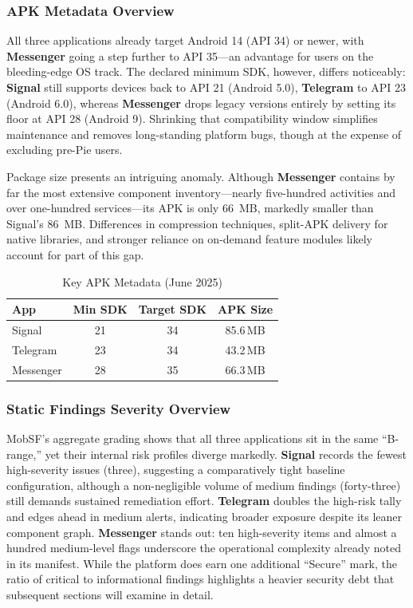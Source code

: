 \documentclass[a4paper,12pt]{report}
\begin{document}
\subsubsection{APK Metadata Overview}
All three applications already target Android 14 (API 34) or newer, with
\textbf{Messenger} going a step further to API 35—an advantage for users on the
bleeding-edge OS track.
The declared minimum SDK, however, differs noticeably:
\textbf{Signal} still supports devices back to API 21 (Android 5.0),
\textbf{Telegram} to API 23 (Android 6.0), whereas \textbf{Messenger} drops
legacy versions entirely by setting its floor at API 28 (Android 9).
Shrinking that compatibility window simplifies maintenance and removes
long-standing platform bugs, though at the expense of excluding pre-Pie users.

Package size presents an intriguing anomaly.
Although \textbf{Messenger} contains by far the most extensive component
inventory—nearly five-hundred activities and over one-hundred services—its APK
is only \SI{66}{MB}, markedly smaller than Signal’s \SI{86}{MB}.
Differences in compression techniques, split-APK delivery for native libraries,
and stronger reliance on on-demand feature modules likely account for part of
this gap.

\begin{table}[htbp]
  \centering
  \caption{Key APK Metadata (June 2025)}
  \label{tab:metadata}
  \begin{tabular}{|l|c|c|c|}
    \hline
    \textbf{App} & \textbf{Min SDK} & \textbf{Target SDK} & \textbf{APK Size} \\ \hline
    Signal    & 21 & 34 & 85.6\,MB \\ \hline
    Telegram  & 23 & 34 & 43.2\,MB \\ \hline
    Messenger & 28 & 35 & 66.3\,MB \\ \hline
  \end{tabular}
\end{table}
\subsubsection{Static Findings Severity Overview}
MobSF’s aggregate grading shows that all three applications sit in the same “B-range,” yet their internal risk profiles diverge markedly. \textbf{Signal} records the fewest high-severity issues (three), suggesting a comparatively tight baseline configuration, although a non-negligible volume of medium findings (forty-three) still demands sustained remediation effort. \textbf{Telegram} doubles the high-risk tally and edges ahead in medium alerts, indicating broader exposure despite its leaner component graph. \textbf{Messenger} stands out: ten high-severity items and almost a hundred medium-level flags underscore the operational complexity already noted in its manifest. While the platform does earn one additional “Secure” mark, the ratio of critical to informational findings highlights a heavier security debt that subsequent sections will examine in detail.
\end{document}

